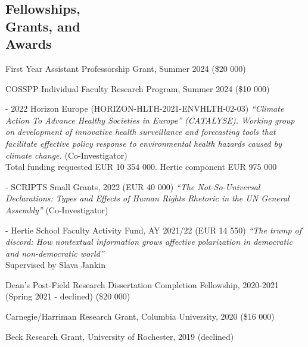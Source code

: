 \documentclass[margin,line,10.95pt]{res}
\begin{document}
\begin{resume}
\section{\sc Fellowships,   \\ Grants,  and  \\Awards}

First Year Assistant Professorship Grant, Summer 2024 (\$20 000)

\vspace*{-3.5mm}

COSSPP Individual Faculty Research Program, Summer 2024 (\$10 000)


- 2022 Horizon Europe (HORIZON-HLTH-2021-ENVHLTH-02-03) \textit{“Climate Action To Advance Healthy Societies in Europe” (CATALYSE). Working group on development of innovative health surveillance and forecasting tools that facilitate effective policy response to environmental health hazards caused by climate change.} (Co-Investigator)
\\
Total funding requested EUR 10 354 000. Hertie component EUR 975 000

\vspace*{-3.5mm}

- SCRIPTS Small Grants, 2022 (EUR 40 000) \textit{“The Not-So-Universal Declarations: Types and Effects of Human Rights Rhetoric in the UN General Assembly”} (Co-Investigator)

\vspace*{-3.5mm}

- Hertie School Faculty Activity Fund, AY 2021/22 (EUR 14 550) \textit{“The trump of discord: How nontextual information grows affective polarization in democratic and non-democratic world”} 
\\
Supervised by Slava Jankin
\\

\vspace*{-4.5mm}

Dean's Post-Field Research Dissertation Completion Fellowship, 2020-2021 (Spring 2021 - declined) (\$20 000)
\vspace*{-4.5mm}

Carnegie/Harriman Research Grant, Columbia University, 2020 (\$16 000)
\vspace*{-4.5mm}

Beck Research Grant, University of Rochester, 2019 (declined)
\vspace*{-4.5mm}


\end{resume}
\end{document}
